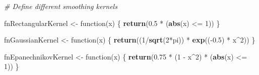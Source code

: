 \documentclass[10pt,]{article}
\newenvironment{Shaded}{\begin{snugshade}}{\end{snugshade}}
\newcommand{\KeywordTok}[1]{\textcolor[rgb]{0.13,0.29,0.53}{\textbf{{#1}}}}
\newcommand{\DecValTok}[1]{\textcolor[rgb]{0.00,0.00,0.81}{{#1}}}
\newcommand{\FloatTok}[1]{\textcolor[rgb]{0.00,0.00,0.81}{{#1}}}
\newcommand{\StringTok}[1]{\textcolor[rgb]{0.31,0.60,0.02}{{#1}}}
\newcommand{\CommentTok}[1]{\textcolor[rgb]{0.56,0.35,0.01}{\textit{{#1}}}}
\newcommand{\NormalTok}[1]{{#1}}
\begin{document}
\begin{Shaded}
\begin{Highlighting}[]
\CommentTok{# Define different smoothing kernels}

\NormalTok{fnRectangularKernel <-}\StringTok{ }\NormalTok{function(x) \{}
  \KeywordTok{return}\NormalTok{(}\FloatTok{0.5} \NormalTok{*}\StringTok{ }\NormalTok{(}\KeywordTok{abs}\NormalTok{(x) <=}\StringTok{ }\DecValTok{1}\NormalTok{))}
\NormalTok{\}}

\NormalTok{fnGaussianKernel <-}\StringTok{ }\NormalTok{function(x) \{}
  \KeywordTok{return}\NormalTok{((}\DecValTok{1}\NormalTok{/}\KeywordTok{sqrt}\NormalTok{(}\DecValTok{2}\NormalTok{*pi)) *}\StringTok{ }\KeywordTok{exp}\NormalTok{((-}\FloatTok{0.5}\NormalTok{) *}\StringTok{ }\NormalTok{x^}\DecValTok{2}\NormalTok{))}
\NormalTok{\}}

\NormalTok{fnEpanechnikovKernel <-}\StringTok{ }\NormalTok{function(x) \{}
  \KeywordTok{return}\NormalTok{(}\FloatTok{0.75} \NormalTok{*}\StringTok{ }\NormalTok{(}\DecValTok{1} \NormalTok{-}\StringTok{ }\NormalTok{x^}\DecValTok{2}\NormalTok{) *}\StringTok{ }\NormalTok{(}\KeywordTok{abs}\NormalTok{(x) <=}\StringTok{ }\DecValTok{1}\NormalTok{))}
\NormalTok{\}}
\end{Highlighting}
\end{Shaded}
\end{document}
